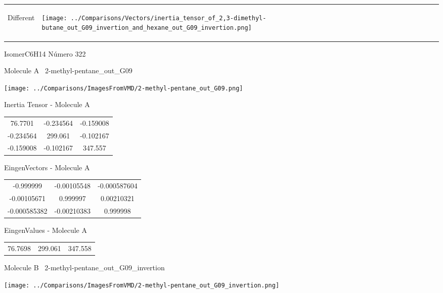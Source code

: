 \vtab[-5mm]
\begin{tabular}{*{2}{m{}}}
\begin{center}
\textcolor{NavyBlue}{\Large Different}
\end{center}
&
\begin{center}
\texttt{[image: ../Comparisons/Vectors/inertia\_tensor\_of\_2,3-dimethyl-butane\_out\_G09\_invertion\_and\_hexane\_out\_G09\_invertion.png]}
\end{center}
\end{tabular}

 \newpage

\vtab[-3cm]
\begin{center}
{\large IsomerC6H14 \tab Número 322}
\end{center}
\begin{multicols}{2}
\begin{center}

Molecule A \
2-methyl-pentane\_out\_G09

\texttt{[image: ../Comparisons/ImagesFromVMD/2-methyl-pentane\_out\_G09.png]}

Inertia Tensor - Molecule A \\
\begin{tabular}{|c c c|}
76.7701	 & 	-0.234564	 & 	-0.159008	 \\
-0.234564	 & 	299.061	 & 	-0.102167	 \\
-0.159008	 & 	-0.102167	 & 	347.557
\end{tabular}

\vtab
 EingenVectors - Molecule A     \\
\begin{tabular}{|c c c|}
-0.999999	 & 	-0.00105548	 & 	-0.000587604	 \\
-0.00105671	 & 	0.999997	 & 	0.00210321	 \\
-0.000585382	 & 	-0.00210383	 & 	0.999998
\end{tabular}

\vtab
 EingenValues - Molecule A     \\
\begin{tabular}{|c c c|}
76.7698	 & 	299.061	 & 	347.558	 \\
\end{tabular}
\columnbreak

Molecule B \
2-methyl-pentane\_out\_G09\_invertion

\texttt{[image: ../Comparisons/ImagesFromVMD/2-methyl-pentane\_out\_G09\_invertion.png]}


\end{center}
\end{multicols}
